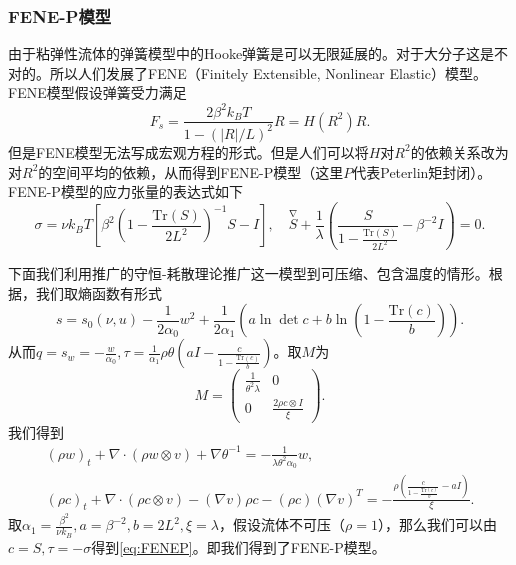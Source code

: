 	\subsubsection{FENE-P模型}
	由于粘弹性流体的弹簧模型中的Hooke弹簧是可以无限延展的。对于大分子这是不对的。所以人们发展了FENE（Finitely Extensible, Nonlinear Elastic）模型。FENE模型假设弹簧受力满足
	\begin{equation*}
		F_s = \frac{2 \beta^2 k_B T}{1-(|R|/L)^2} R = H(R^2)R.
	\end{equation*}
	但是FENE模型无法写成宏观方程的形式\cite{le2009multiscale}。但是人们可以将$H$对$R^2$的依赖关系改为对$R^2$的空间平均的依赖，从而得到FENE-P模型（这里$P$代表Peterlin矩封闭\cite{larson1999structure,le2009multiscale,masmoudi2011global}）。FENE-P模型的应力张量的表达式如下
	\begin{equation} \label{eq:FENEP}
		\sigma = \nu k_B T [ \beta^2 (1- \frac{\mbox{Tr}(S)}{2L^2})^{-1}S - I],  \quad \stackrel{\nabla} S + \frac{1}{\lambda} (\frac{S}{1-\frac{\mbox{Tr}(S)}{2L^2}} - \beta^{-2}I) = 0. 
	\end{equation}

	下面我们利用推广的守恒-耗散理论推广这一模型到可压缩、包含温度的情形。根据\cite{masmoudi2011global,hu2007new}，我们取熵函数有形式
	\begin{equation*}
		s = s_0(\nu,u)  - \frac{1}{2  \alpha_0} w^2 + \frac{1}{2 \alpha_1} (a \ln \det c + b \ln(1-\frac{\mbox{Tr}(c)}{b})).
	\end{equation*}
	从而$q=s_w=-\frac{ w}{\alpha_0},\tau = \frac{1}{\alpha_1} \rho \theta (a I-\frac{c}{1-\frac{\mbox{Tr}(c)}{b}})$。取$M$为
	\begin{equation*}
		M = \left( \begin{array}{ccc} 
			\frac{1}{\theta^2 \lambda} & 0 \\
			0 &  \frac{2 \rho  c \otimes I}{\xi}   
		\end{array} \right).
	\end{equation*}
	我们得到
	\begin{subequations}\label{eq:generalizedFENEP}
		\begin{align}
			(\rho w)_t + \nabla \cdot (\rho w \otimes v) + \nabla \theta^{-1} = -\frac{1}{\lambda \theta^2 \alpha_0} w, \\
			(\rho c)_t +  \nabla \cdot (\rho c \otimes v) - (\nabla v) \rho c - (\rho c) (\nabla v)^T  = -\frac{\rho (\frac{c}{1-\frac{\mbox{Tr}(c)}{b}}-a I) }{\xi}.
		\end{align}
	\end{subequations}
	取$\alpha_1 = \frac{\beta^2}{\nu k_B},a=\beta^{-2},b=2L^2,\xi = \lambda$，假设流体不可压（$\rho=1$），那么我们可以由$c=S,\tau = -\sigma$得到\eqref{eq:FENEP}。即我们得到了FENE-P模型。

